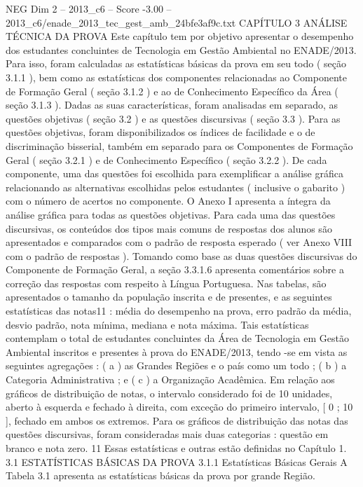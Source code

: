 \begin{textsample}{NEG Dim 2 – 2013\_c6 – Score -3.00 – 2013\_c6/enade\_2013\_tec\_gest\_amb\_24bfe3af9c.txt}  \label{ex:f2_neg_053}
CAPÍTULO 3 ANÁLISE TÉCNICA DA PROVA Este capítulo tem por objetivo apresentar o desempenho dos estudantes concluintes de Tecnologia em Gestão Ambiental no ENADE/2013.
Para isso, foram calculadas as estatísticas básicas da prova em seu todo ( seção 3.1.1 ), bem como as estatísticas dos componentes relacionadas ao Componente de Formação Geral ( seção 3.1.2 ) e ao de Conhecimento Específico da Área ( seção 3.1.3 ).
Dadas as suas características, foram analisadas em separado, as questões objetivas ( seção 3.2 ) e as questões discursivas ( seção 3.3 ).
Para as questões objetivas, foram disponibilizados os índices de facilidade e o de discriminação bisserial, também em separado para os Componentes de Formação Geral ( seção 3.2.1 ) e de Conhecimento Específico ( seção 3.2.2 ).
De cada componente, uma das questões foi escolhida para exemplificar a análise gráfica relacionando as alternativas escolhidas pelos estudantes ( inclusive o gabarito ) com o número de acertos no componente.
O Anexo I apresenta a íntegra da análise gráfica para todas as questões objetivas.
Para cada uma das questões discursivas, os conteúdos dos tipos mais comuns de respostas dos alunos são apresentados e comparados com o padrão de resposta esperado ( ver Anexo VIII com o padrão de respostas ).
Tomando como base as duas questões discursivas do Componente de Formação Geral, a seção 3.3.1.6 apresenta comentários sobre a correção das respostas com respeito à Língua Portuguesa.
Nas tabelas, são apresentados o tamanho da população inscrita e de presentes, e as seguintes estatísticas das notas11 : média do desempenho na prova, erro padrão da média, desvio padrão, nota mínima, mediana e nota máxima.
Tais estatísticas contemplam o total de estudantes concluintes da Área de Tecnologia em Gestão Ambiental inscritos e presentes à prova do ENADE/2013, tendo -se em vista as seguintes agregações : ( a ) as Grandes Regiões e o país como um todo ; ( b ) a Categoria Administrativa ; e ( c ) a Organização Acadêmica.
Em relação aos gráficos de distribuição de notas, o intervalo considerado foi de 10 unidades, aberto à esquerda e fechado à direita, com exceção do primeiro intervalo, [ 0 ; 10 ], fechado em ambos os extremos.
Para os gráficos de distribuição das notas das questões discursivas, foram consideradas mais duas categorias : questão em branco e nota zero. 11 Essas estatísticas e outras estão definidas no Capítulo 1. 3.1 ESTATÍSTICAS BÁSICAS DA PROVA 3.1.1 Estatísticas Básicas Gerais A Tabela 3.1 apresenta as estatísticas básicas da prova por grande Região.

\end{textsample}
